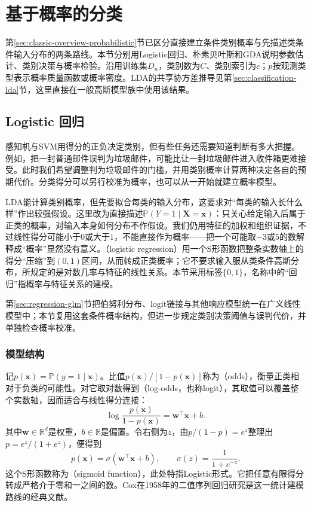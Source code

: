 \section{基于概率的分类}
\label{sec:classification-probability}

第\ref{sec:classic-overview-probabilistic}节已区分直接建立条件类别概率与先描述类条件输入分布的两条路线。本节分别用Logistic回归、朴素贝叶斯和GDA说明参数估计、类别决策与概率检验。沿用训练集$D_n$，类别数为$C$、类别索引为$c$；$p$按观测类型表示概率质量函数或概率密度。LDA的共享协方差推导见第\ref{sec:classification-lda}节，这里直接在一般高斯模型族中使用该结果。

\subsection{Logistic 回归}
\label{sec:classification-logistic}

感知机与SVM用得分的正负决定类别，但有些任务还需要知道判断有多大把握。例如，把一封普通邮件误判为垃圾邮件，可能比让一封垃圾邮件进入收件箱更难接受。此时我们希望调整判为垃圾邮件的门槛，并用类别概率计算两种决定各自的预期代价。分类得分可以另行校准为概率，也可以从一开始就建立概率模型。

LDA能计算类别概率，但先要拟合每类的输入分布，这要求对“每类的输入长什么样”作出较强假设。这里改为直接描述$\mathbb P(Y=1\mid\bm X=\bm x)$：只关心给定输入后属于正类的概率，对输入本身如何分布不作假设。我们仍用特征的加权和组织证据，不过线性得分可能小于$0$或大于$1$，不能直接作为概率——把一个可能取$-3$或$5$的数解释成“概率”显然没有意义。（logistic regression）用一个S形函数把整条实数轴上的得分“压缩”到$(0,1)$区间，从而转成正类概率；它不要求输入服从类条件高斯分布，所规定的是对数几率与特征的线性关系。本节采用标签$\{0,1\}$，名称中的“回归”指概率与特征关系的建模。

第\ref{sec:regression-glm}节把伯努利分布、logit链接与其他响应模型统一在广义线性模型中；本节复用这套条件概率结构，但进一步规定类别决策阈值与误判代价，并单独检查概率校准。

\subsubsection{模型结构}
\label{sec:classification-logistic-structure}

记$p(\bm{x})=\mathbb{P}(y=1\mid\bm{x})$。比值$p(\bm{x})/[1-p(\bm{x})]$称为（odds），衡量正类相对于负类的可能性。对它取对数得到（log-odds，也称logit），其取值可以覆盖整个实数轴，因而适合与线性得分连接：
\begin{equation}
  \label{eq:classification-logistic-logodds}
  \log\frac{p(\bm{x})}{1-p(\bm{x})}
  =\bm{w}^{\top}\bm{x}+b.
\end{equation}
其中$\bm{w}\in\mathbb{R}^{d}$是权重，$b\in\mathbb{R}$是偏置。令右侧为$z$，由$p/(1-p)=e^z$整理出$p=e^z/(1+e^z)$，便得到
\begin{equation}
  \label{eq:classification-logistic-sigmoid}
  p(\bm{x})=\sigma(\bm{w}^{\top}\bm{x}+b),
  \qquad
  \sigma(z)=\frac{1}{1+e^{-z}}.
\end{equation}
这个S形函数称为（sigmoid function），此处特指Logistic形式。它把任意有限得分转成严格介于零和一之间的数。Cox在1958年的二值序列回归研究是这一统计建模路线的经典文献。

